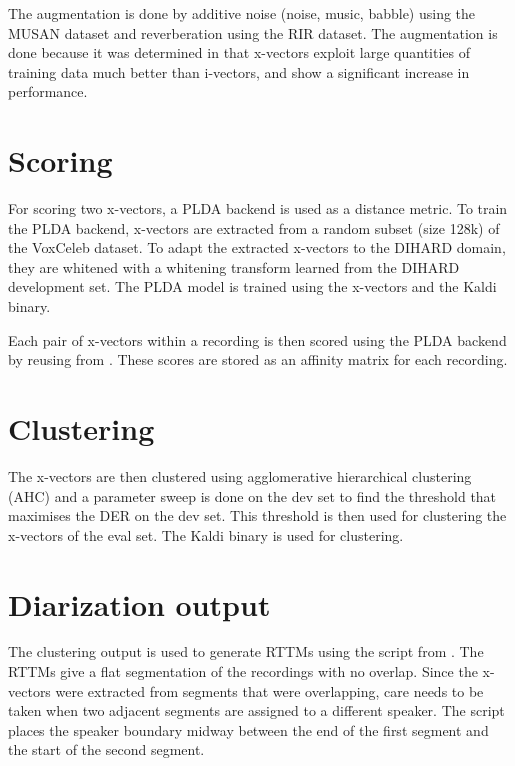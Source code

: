 The augmentation is done by additive noise (noise, music, babble) using the MUSAN dataset and reverberation using the RIR dataset. The augmentation is done because it was determined in \cite{snyder2018x} that x-vectors exploit large quantities of training data much better than i-vectors, and show a significant increase in performance.

\section{Scoring}
For scoring two x-vectors, a PLDA backend is used as a distance metric. To train the PLDA backend, x-vectors are extracted from a random subset (size 128k) of the VoxCeleb dataset. To adapt the extracted x-vectors to the DIHARD domain, they are whitened with a whitening transform learned from the DIHARD development set. The PLDA model is trained using the x-vectors and the  Kaldi binary.

Each pair of x-vectors within a recording is then scored using the PLDA backend by reusing  from . These scores are stored as an affinity matrix for each recording.

\section{Clustering}
The x-vectors are then clustered using agglomerative hierarchical clustering (AHC) and a parameter sweep is done on the dev set to find the threshold that maximises the DER on the dev set. This threshold is then used for clustering the x-vectors of the eval set. The  Kaldi binary is used for clustering.

\section{Diarization output}
The clustering output is used to generate RTTMs using the script  from . The RTTMs give a flat segmentation of the recordings with no overlap. Since the x-vectors were extracted from segments that were overlapping, care needs to be taken when two adjacent segments are assigned to a different speaker. The script places the speaker boundary midway between the end of the first segment and the start of the second segment.

